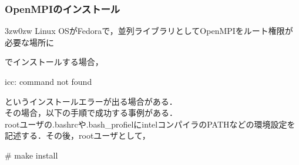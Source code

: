 \subsubsection{OpenMPIのインストール}
\begin{indentation}{3zw}{0zw}
Linux OSがFedoraで，並列ライブラリとしてOpenMPIをルート権限が必要な場所に
でインストールする場合，
\begin{program}
icc: command not found
\end{program}
というインストールエラーが出る場合がある．\\

その場合，以下の手順で成功する事例がある．\\

rootユーザの.bashrcや.bash\_profielにintelコンパイラのPATHなどの環境設定を記述する．その後，rootユーザとして，
\begin{program}
# make install
\end{program}
\end{indentation}